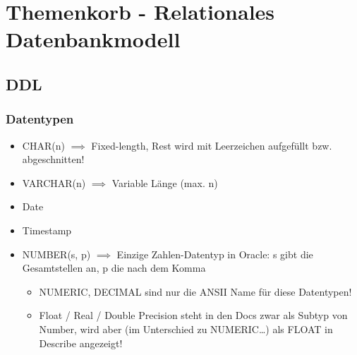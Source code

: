 \chapter{Themenkorb - Relationales Datenbankmodell}

\section{DDL}
\subsection{Datentypen}
\begin{itemize}
    \item CHAR(n) $\implies$ Fixed-length, Rest wird mit Leerzeichen aufgefüllt bzw. abgeschnitten!
    \item VARCHAR(n) $\implies$ Variable Länge (max. n)
    \item Date
    \item Timestamp
    \item NUMBER(s, p) $\implies$ Einzige Zahlen-Datentyp in Oracle: s gibt die Gesamtstellen an, p die nach dem Komma
    \begin{itemize}
        \item NUMERIC, DECIMAL sind nur die ANSII Name für diese Datentypen!
        \item Float / Real / Double Precision steht in den Docs zwar als Subtyp von Number, wird aber (im Unterschied zu NUMERIC\dots) als FLOAT in Describe angezeigt!
    \end{itemize}
\end{itemize}

